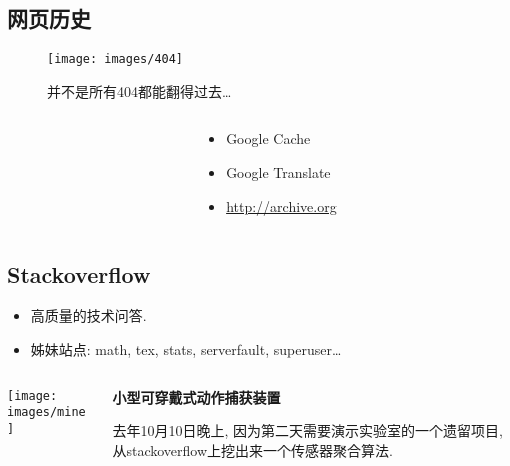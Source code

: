 \documentclass[compress]{beamer}
\begin{document}
\subsection{网页历史}

\begin{frame}
    \begin{figure}
        \texttt{[image: images/404]}
        \caption{并不是所有404都能翻得过去\ldots}
    \end{figure}
\end{frame}

\begin{frame}{\insertsubsection}
    \begin{columns}
        \begin{column}{0.3\textwidth}
        \end{column}
        \begin{column}{0.7\textwidth}
            \begin{itemize}[<+->]
                \item Google Cache
                \item Google Translate
                \item \url{http://archive.org}
            \end{itemize}
        \end{column}
    \end{columns}
\end{frame}

\subsection{Stackoverflow}

\begin{frame}{\insertsubsection}
    \begin{itemize}[<+->]
        \item 高质量的技术问答.
        \item 姊妹站点: math, tex, stats, serverfault, superuser\ldots
    \end{itemize}
\end{frame}

\begin{frame}{\insertsubsection}
    \begin{columns}[T]
        \begin{column}{0.4\textwidth}
            \texttt{[image: images/mine]}
        \end{column}
        \begin{column}{0.6\textwidth}
            \textbf{小型可穿戴式动作捕获装置}
            \par
            \vspace{1em}
            去年10月10日晚上, 因为第二天需要演示实验室的一个遗留项目, 从stackoverflow上挖出来一个传感器聚合算法.
        \end{column}
    \end{columns}
\end{frame}
\end{document}
